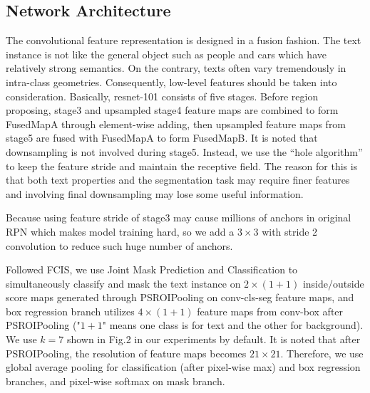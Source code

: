 \documentclass[a4paper,conference]{IEEEtran}
\begin{document}
\subsection{Network Architecture}
The convolutional feature representation is designed in a fusion fashion. The text instance is not like the general object such as people and cars which have relatively strong semantics. On the  contrary, texts often vary tremendously in intra-class geometries. Consequently, low-level features should be taken into consideration. Basically, resnet-101 consists of five stages. Before region proposing, stage3 and upsampled stage4 feature maps are combined to form FusedMapA through element-wise adding, then upsampled feature maps from stage5 are fused with FusedMapA to form FusedMapB. It is noted that downsampling is not involved during stage5. Instead, we use the “hole algorithm”\cite{chen2016deeplab,long2015fully} to keep the feature stride and maintain the receptive field. The reason for this is that both text properties and the segmentation task may require finer features and involving final downsampling may lose some useful information.

Because using feature stride of stage3 may cause  millions of anchors in original RPN\cite{Ren2017Faster} which makes model training hard, so we add a \begin{math}3\times3\end{math} with stride 2 convolution to reduce such huge number of anchors.

Followed FCIS\cite{li2016fully}, we use Joint Mask Prediction and Classification to simultaneously classify and mask the text instance on \begin{math}2\times(1+1)\end{math} inside/outside score maps generated through PSROIPooling on conv-cls-seg feature maps, and box regression branch utilizes  \begin{math}4\times(1+1)\end{math} feature maps from conv-box after PSROIPooling ("\begin{math}1+1\end{math}" means one class is for text and the other for background). We use  \begin{math}k=7\end{math} shown in Fig.2 in our experiments by default. It is noted that after PSROIPooling, the resolution of feature maps becomes  \begin{math}21\times21\end{math}. Therefore, we use global average pooling\cite{lin2013network} for classification (after pixel-wise max) and box regression branches, and pixel-wise softmax on mask branch.  
\end{document}
